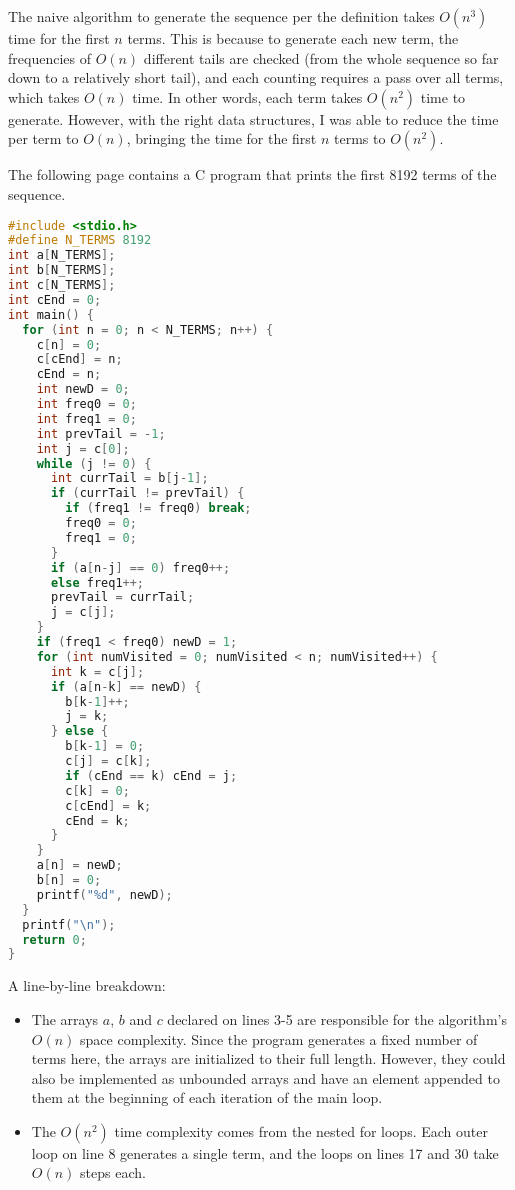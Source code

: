 \documentclass{article}
\begin{document}
The naive algorithm to generate the sequence per the definition
takes $O(n^3)$ time for the first $n$ terms.
This is because to generate each new term,
the frequencies of $O(n)$ different tails are checked
(from the whole sequence so far down to a relatively short tail),
and each counting requires a pass over all terms,
which takes $O(n)$ time.
In other words, each term takes $O(n^2)$ time to generate.
However, with the right data structures,
I was able to reduce the time per term to $O(n)$,
bringing the time for the first $n$ terms to $O(n^2)$.

The following page contains a C program
that prints the first 8192 terms of the sequence.

\newpage

\begin{lstlisting}[language=c]
#include <stdio.h>
#define N_TERMS 8192
int a[N_TERMS];
int b[N_TERMS];
int c[N_TERMS];
int cEnd = 0;
int main() {
  for (int n = 0; n < N_TERMS; n++) {
    c[n] = 0;
    c[cEnd] = n;
    cEnd = n;
    int newD = 0;
    int freq0 = 0;
    int freq1 = 0;
    int prevTail = -1;
    int j = c[0];
    while (j != 0) { 
      int currTail = b[j-1];
      if (currTail != prevTail) {
        if (freq1 != freq0) break;
        freq0 = 0;
        freq1 = 0;
      }
      if (a[n-j] == 0) freq0++;
      else freq1++;
      prevTail = currTail;
      j = c[j];
    }
    if (freq1 < freq0) newD = 1;
    for (int numVisited = 0; numVisited < n; numVisited++) {
      int k = c[j];
      if (a[n-k] == newD) {
        b[k-1]++;
        j = k;
      } else {
        b[k-1] = 0;
        c[j] = c[k];
        if (cEnd == k) cEnd = j;
        c[k] = 0;
        c[cEnd] = k;
        cEnd = k;
      }
    }
    a[n] = newD;
    b[n] = 0;
    printf("%d", newD);
  }
  printf("\n");
  return 0;
}
\end{lstlisting}

\newpage

A line-by-line breakdown:

\begin{itemize}
\item
  The arrays $a$, $b$ and $c$ declared on lines 3-5
  are responsible for the algorithm's $O(n)$ space complexity.
  Since the program generates a fixed number of terms here,
  the arrays are initialized to their full length.
  However, they could also be implemented as unbounded arrays
  and have an element appended to them at the beginning
  of each iteration of the main loop.
\item
  The $O(n^2)$ time complexity
  comes from the nested for loops. 
  Each outer loop on line 8 generates a single term,
  and the loops on lines 17 and 30 take $O(n)$ steps each.
\end{itemize}
\end{document}

